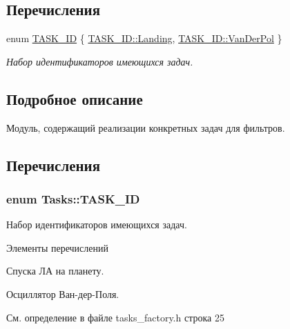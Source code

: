\subsection*{Перечисления}
\begin{DoxyCompactItemize}
\item 
enum \hyperlink{namespace_tasks_acf6b541f8ce51b63eb9fcb8748317707}{T\+A\+S\+K\+\_\+\+ID} \{ \hyperlink{namespace_tasks_acf6b541f8ce51b63eb9fcb8748317707a41bd61e268fedccfb0d91dd571dd28b2}{T\+A\+S\+K\+\_\+\+I\+D\+::\+Landing}, 
\hyperlink{namespace_tasks_acf6b541f8ce51b63eb9fcb8748317707a7d65b6ff850300fd593c198f76e32d99}{T\+A\+S\+K\+\_\+\+I\+D\+::\+Van\+Der\+Pol}
 \}\begin{DoxyCompactList}\small\item\em Набор идентификаторов имеющихся задач. \end{DoxyCompactList}
\end{DoxyCompactItemize}


\subsection{Подробное описание}
Модуль, содержащий реализации конкретных задач для фильтров. 

\subsection{Перечисления}
\subsubsection[{\texorpdfstring{T\+A\+S\+K\+\_\+\+ID}{TASK_ID}}]{\setlength{\rightskip}{0pt plus 5cm}enum {\bf Tasks\+::\+T\+A\+S\+K\+\_\+\+ID}\hspace{0.3cm}{\ttfamily [strong]}}\hypertarget{namespace_tasks_acf6b541f8ce51b63eb9fcb8748317707}{}\label{namespace_tasks_acf6b541f8ce51b63eb9fcb8748317707}


Набор идентификаторов имеющихся задач. 

\begin{Desc}
\item[Элементы перечислений]\par
\begin{description}
\item[{\em 
Landing\hypertarget{namespace_tasks_acf6b541f8ce51b63eb9fcb8748317707a41bd61e268fedccfb0d91dd571dd28b2}{}\label{namespace_tasks_acf6b541f8ce51b63eb9fcb8748317707a41bd61e268fedccfb0d91dd571dd28b2}
}]Спуска ЛА на планету. \item[{\em 
Van\+Der\+Pol\hypertarget{namespace_tasks_acf6b541f8ce51b63eb9fcb8748317707a7d65b6ff850300fd593c198f76e32d99}{}\label{namespace_tasks_acf6b541f8ce51b63eb9fcb8748317707a7d65b6ff850300fd593c198f76e32d99}
}]Осциллятор Ван-\/дер-\/Поля. \end{description}
\end{Desc}


См. определение в файле tasks\+\_\+factory.\+h строка 25

